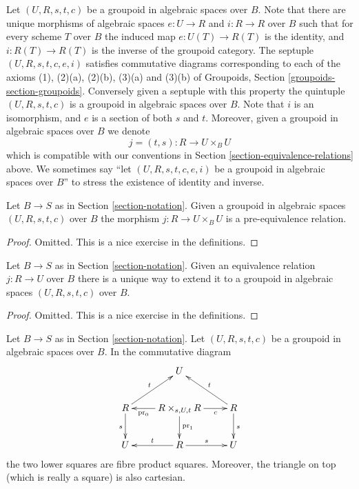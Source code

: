 \noindent
Let $(U, R, s, t, c)$ be a groupoid in algebraic spaces over $B$.
Note that there are unique morphisms of algebraic spaces
$e : U \to R$ and $i : R \to R$ over $B$ such that for every scheme $T$
over $B$ the induced map $e : U(T) \to R(T)$ is the identity, and
$i : R(T) \to R(T)$ is the inverse of the groupoid category.
The septuple $(U, R, s, t, c, e, i)$ satisfies commutative diagrams
corresponding to each of the axioms (1), (2)(a), (2)(b), (3)(a) and (3)(b) of
Groupoids, Section \ref{groupoids-section-groupoids}.
Conversely given a septuple with this property the quintuple $(U, R, s, t, c)$
is a groupoid in algebraic spaces over $B$. Note that $i$ is an isomorphism,
and $e$ is a section of both $s$ and $t$.
Moreover, given a groupoid in algebraic spaces over $B$ we denote
$$
j = (t, s) : R \longrightarrow U \times_B U
$$
which is compatible with our conventions in
Section \ref{section-equivalence-relations}
above. We sometimes say ``let $(U, R, s, t, c, e, i)$ be a
groupoid in algebraic spaces over $B$'' to stress the existence of identity and
inverse.

\begin{lemma}
\label{lemma-groupoid-pre-equivalence}
Let $B \to S$ as in Section \ref{section-notation}.
Given a groupoid in algebraic spaces $(U, R, s, t, c)$ over $B$
the morphism $j : R \to U\times_B U$ is a pre-equivalence
relation.
\end{lemma}

\begin{proof}
Omitted.
This is a nice exercise in the definitions.
\end{proof}

\begin{lemma}
\label{lemma-equivalence-groupoid}
Let $B \to S$ as in Section \ref{section-notation}.
Given an equivalence relation $j : R \to U$ over $B$
there is a unique way to extend it to a groupoid in algebraic spaces
$(U, R, s, t, c)$ over $B$.
\end{lemma}

\begin{proof}
Omitted.
This is a nice exercise in the definitions.
\end{proof}

\begin{lemma}
\label{lemma-diagram}
Let $B \to S$ as in Section \ref{section-notation}.
Let $(U, R, s, t, c)$ be a groupoid in algebraic spaces over $B$.
In the commutative diagram
$$
\xymatrix{
& U & \\
R \ar[d]_s \ar[ru]^t &
R \times_{s, U, t} R
\ar[l]^-{\text{pr}_0} \ar[d]^{\text{pr}_1} \ar[r]_-c &
R \ar[d]^s \ar[lu]_t \\
U & R \ar[l]_t \ar[r]^s & U
}
$$
the two lower squares are fibre product squares.
Moreover, the triangle on top (which is really a square)
is also cartesian.
\end{lemma}

